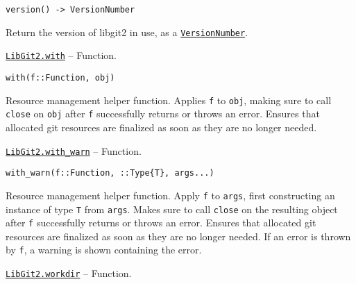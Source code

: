 \begin{adjustwidth}{2em}{0pt}


\begin{verbatim}
version() -> VersionNumber
\end{verbatim}

Return the version of libgit2 in use, as a \hyperlink{12935585355849408291}{\texttt{VersionNumber}}.



\end{adjustwidth}
\hypertarget{11949205828120857817}{}
\hyperlink{11949205828120857817}{\texttt{LibGit2.with}}  -- {Function.}

\begin{adjustwidth}{2em}{0pt}


\begin{verbatim}
with(f::Function, obj)
\end{verbatim}

Resource management helper function. Applies \texttt{f} to \texttt{obj}, making sure to call \texttt{close} on \texttt{obj} after \texttt{f} successfully returns or throws an error. Ensures that allocated git resources are finalized as soon as they are no longer needed.



\end{adjustwidth}
\hypertarget{17446520273049220374}{}
\hyperlink{17446520273049220374}{\texttt{LibGit2.with\_warn}}  -- {Function.}

\begin{adjustwidth}{2em}{0pt}


\begin{verbatim}
with_warn(f::Function, ::Type{T}, args...)
\end{verbatim}

Resource management helper function. Apply \texttt{f} to \texttt{args}, first constructing an instance of type \texttt{T} from \texttt{args}. Makes sure to call \texttt{close} on the resulting object after \texttt{f} successfully returns or throws an error. Ensures that allocated git resources are finalized as soon as they are no longer needed. If an error is thrown by \texttt{f}, a warning is shown containing the error.



\end{adjustwidth}
\hypertarget{6689577338311178757}{}
\hyperlink{6689577338311178757}{\texttt{LibGit2.workdir}}  -- {Function.}

